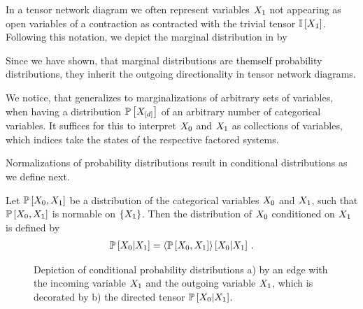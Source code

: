 In a tensor network diagram we often represent variables $X_{1}$ not appearing as open variables of a contraction as contracted with the trivial tensor $\mathbb{I}\left[X_{1}\right]$.
Following this notation, we depict the marginal distribution in  by
\begin{center}
    
\end{center}
Since we have shown, that marginal distributions are themself probability distributions, they inherit the outgoing directionality in tensor network diagrams.

We notice, that  generalizes to marginalizations of arbitrary sets of variables, when having a distribution $\mathbb{P}\left[X_{[d]}\right]$ of an arbitrary number of categorical variables.
It suffices for this to interpret $X_{0}$ and $X_{1}$ as collections of variables, which indices take the states of the respective factored systems.


Normalizations of probability distributions result in conditional distributions as we define next.

\begin{definition}
    \label{def:conditionalProbability}
    Let $\mathbb{P}\left[X_{0},X_{1}\right]$ be a distribution of the categorical variables $X_{0}$ and $X_{1}$, such that $\mathbb{P}\left[X_{0},X_{1}\right]$ is normable on $\{X_{1}\}$.
    Then the distribution of $X_{0}$ conditioned on $X_{1}$ is defined by
    \begin{align*}
        \mathbb{P}\left[X_{0}|X_{1}\right]
        = \left\langle \mathbb{P}\left[X_{0},X_{1}\right]\right\rangle \left[ X_{0} | X_{1} \right] \, .
    \end{align*}
\end{definition}

\begin{figure}[hbt!]
    \begin{center}
        
    \end{center}
    \caption{Depiction of conditional probability distributions a) by an edge with the incoming variable $X_{1}$ and the outgoing variable $X_{1}$, which is decorated by b) the directed tensor $\mathbb{P}\left[X_{0}|X_{1}\right]$. }
    \label{fig:conditionalDistribution}
\end{figure}

